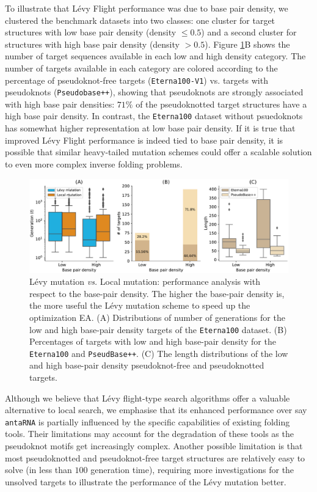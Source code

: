 To illustrate that Lévy Flight performance was due to base pair density, we clustered the benchmark datasets into two classes: one cluster for target structures with low base pair density (density $\leq 0.5$) and a second cluster for structures with high base pair density (density $> 0.5$). Figure \ref{Fig:diversity2}B shows the number of target sequences available in each low and high density category. The number of targets available in each category are colored according to the percentage of pseudoknot-free targets (\texttt{Eterna100-V1}) vs. targets with pseudoknots (\texttt{Pseudobase++}), showing that pseudoknots are strongly associated with high base pair densities: $71\%$ of the pseudoknotted target structures have a high base pair density.  In contrast, the \texttt{Eterna100} dataset without psuedoknots has somewhat higher representation at low base pair density. If it is true that improved Lévy Flight performance is indeed tied to base pair density, it is possible that similar heavy-tailed mutation schemes could offer a scalable solution to even more complex inverse folding problems. 
\begin{figure}[t!]
	\centering
	\includegraphics[width=1.05\linewidth]{../res/images/arnaque/fig10.pdf}
	\small
	\caption{Lévy mutation \emph{vs.} Local mutation: performance analysis with respect to the base-pair density. The higher the base-pair density is, the more useful the Lévy mutation scheme to speed up the optimization EA. (A) Distributions of number of generations for the low and high base-pair density targets of the \texttt{Eterna100} dataset. (B) Percentages of targets with low and high base-pair density for the \texttt{Eterna100} and \texttt{PseudBase++}. (C) The length distributions of the low and high base-pair density pseudoknot-free and pseudoknotted targets.} \label{Fig:diversity2}
\end{figure}
Although we believe that Lévy flight-type search algorithms offer a valuable alternative to local search, we emphasise that its enhanced performance over say \texttt{antaRNA} is partially influenced by the specific capabilities of existing folding tools. Their limitations may account for the degradation of these tools as the pseudoknot motifs get increasingly complex. Another possible limitation is that most pseudoknotted and pseudoknot-free target structures are relatively easy to solve (in less than $100$ generation time), requiring more investigations for the unsolved targets to illustrate the performance of the Lévy mutation better.

